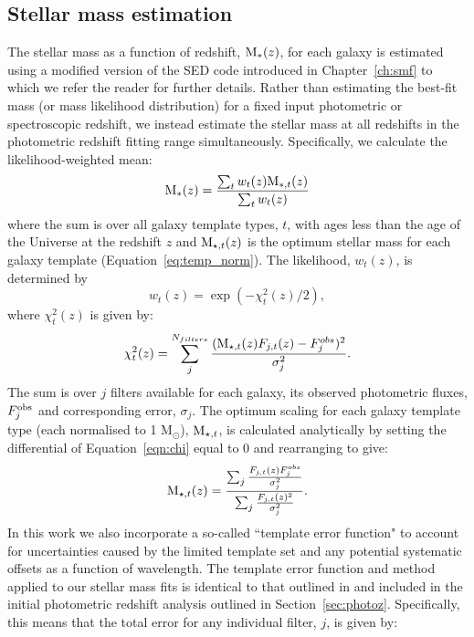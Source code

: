 \subsection{Stellar mass estimation}\label{sec:stellarmass}
The stellar mass as a function of redshift, $\textup{M}_{*} (z)$, for each galaxy is estimated using a modified version of the SED code introduced in Chapter~\ref{ch:smf} to which we refer the reader for further details. Rather than estimating the best-fit mass (or mass likelihood distribution) for a fixed input photometric or spectroscopic redshift, we instead estimate the stellar mass at all redshifts in the photometric redshift fitting range simultaneously. Specifically, we calculate the likelihood-weighted mean:
\begin{equation}
	\textup{M}_{*} (z) = \frac{\sum_{t}^{} w_{t}(z) \text{M}_{*,t}(z)} {\sum_{t} w_{t}(z)}
\end{equation}
where the sum is over all galaxy template types, $t$, with ages less than the age of the Universe at the redshift $z$ and $\textup{M}_{\star,t}(z)$ is the optimum stellar mass for each galaxy template (Equation~\ref{eq:temp_norm}). The likelihood, $w_{t}(z)$, is determined by
\begin{equation}
	w_{t}(z) = \exp(-\chi_{t}^{2}(z)/2),	
\end{equation}
where $\chi^{2}_{t}(z)$ is given by:
\begin{equation}\label{eqn:chi}
  \chi^{2}_{t}(z) = \sum_{j}^{N_{filters}} \frac{(\textup{M}_{\star,t}(z) F_{j,t}(z) - F_{j}^{obs})^2} {\sigma_{j}^{2}}.
\end{equation}
The sum is over $j$ filters available for each galaxy, its observed photometric fluxes, $F_{j}^{\textup{obs}}$ and corresponding error, $\sigma_{j}$. The optimum scaling for each galaxy template type (each normalised to 1 M$_{\odot}$), $\textup{M}_{\star,t}$, is calculated analytically by setting the differential of Equation~\ref{eqn:chi} equal to 0 and rearranging to give:
\begin{equation}\label{eq:temp_norm}
	\textup{M}_{\star,t}(z) = 
\frac{\sum_{j} \frac{F_{j,t}(z)F_{j}^{obs}}{\sigma^{2}_{j}} }  { \sum_{j} \frac{F_{j,t}(z)^{2}}{\sigma^{2}_{j}}  }.
\end{equation}
In this work we also incorporate a so-called ``template error function" to account for uncertainties caused by the limited template set and any potential systematic offsets as a function of wavelength. The template error function and method applied to our stellar mass fits is identical to that outlined in \citet{Brammer:2008gn} and included in the initial photometric redshift analysis outlined in Section~\ref{sec:photoz}. Specifically, this means that the total error for any individual filter, $j$, is given by:
